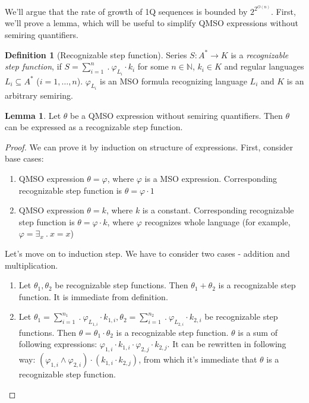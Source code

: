 \documentclass[12pt]{article}
\theoremstyle{definition}
\newtheorem{definition}{Definition}[section]
\newtheorem{lemma}[theorem]{Lemma}
\begin{document}
We’ll argue that the rate of growth of 1Q sequences is bounded by $2^{2^{O(n)}}$. First, we’ll prove a lemma, which will be useful to simplify QMSO expressions without semiring quantifiers.

\begin{definition}[Recognizable step function]
    \label{DefRecStepFun}
    Series $S: A^* \rightarrow K$ is a \textit{recognizable step function}, if $S = \sum_{i = 1}^{n} \ . \ \varphi_{L_i} \cdot k_i$ for some $n \in \mathbb{N}$, $k_i \in K$ and regular languages $L_i \subseteq A^*$ ($i=1,\ldots,n$). $\varphi_{L_i}$ is an MSO formula recognizing language $L_i$ and $K$ is an arbitrary semiring.
\end{definition}

\begin{lemma}
    \label{QFreeRecognizable}
    Let $\theta$ be a QMSO expression without semiring quantifiers. Then $\theta$ can be expressed as a recognizable step function.
\end{lemma}

\begin{proof}
    We can prove it by induction on structure of expressions.
    First, consider base cases:
    \begin{enumerate}
        \item QMSO expression $\theta = \varphi$, where $\varphi$ is a MSO expression. Corresponding recognizable step function is $\theta = \varphi \cdot 1$
        \item QMSO expression $\theta = k$, where $k$ is a constant. Corresponding recognizable step function is $\theta = \varphi \cdot k$, where $\varphi$ recognizes whole language (for example, $\varphi = \exists_x \ . \ x = x$)
    \end{enumerate}

    Let's move on to induction step. We have to consider two cases - addition and multiplication.
    \begin{enumerate}
        \item Let $\theta_1, \theta_2$ be recognizable step functions. Then $\theta_1 + \theta_2$ is a recognizable step function. It is immediate from definition.
        \item Let $\theta_1 = \sum_{i = 1}^{n_1} \ . \ \varphi_{L_{1,i}} \cdot k_{1,i}, \theta_2 = \sum_{i = 1}^{n_2} \ . \ \varphi_{L_{2,i}} \cdot k_{2,i}$ be recognizable step functions. Then $\theta = \theta_1 \cdot \theta_2$ is a recognizable step function. $\theta$ is a sum of following expressions: $\varphi_{1,i} \cdot k_{1, i} \cdot \varphi_{2,j} \cdot k_{2,j}$. It can be rewritten in following way: $(\varphi_{1,i} \land \varphi_{2,i}) \cdot (k_{1,i} \cdot k_{2,j})$, from which it's immediate that $\theta$ is a recognizable step function.
    \end{enumerate}
    
\end{proof}
\end{document}
